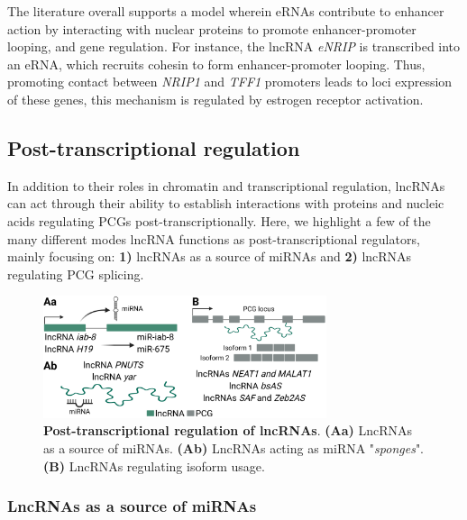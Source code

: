 The literature overall supports a model wherein eRNAs contribute to enhancer action by interacting with nuclear proteins to promote enhancer-promoter looping, and gene regulation.\autocite{arnold_2020_diversity,statello_2021_lncRNA_reg} For instance, the lncRNA \textit{eNRIP} is transcribed into an eRNA, which recruits cohesin to form enhancer-promoter looping. Thus, promoting contact between \textit{NRIP1} and \textit{TFF1} promoters leads to loci expression of these genes, this mechanism is regulated by estrogen receptor activation.\autocite{statello_2021_lncRNA_reg}

\subsection{Post-transcriptional regulation}
\label{sub-sec:lncRNA_post_trans_reg}

In addition to their roles in chromatin and transcriptional regulation, lncRNAs can act through their ability to establish interactions with proteins and nucleic acids regulating PCGs post-transcriptionally.\autocite{romero_2018_splicing,kopp_2018_functional} Here, we highlight a few of the many different modes lncRNA functions as post-transcriptional regulators, mainly focusing on: \textbf{1)} lncRNAs as a source of miRNAs and \textbf{2)} lncRNAs regulating PCG splicing. 

\begin{figure}[!htb]
  \centering
  \includegraphics[width=0.74\textwidth]{img/introduction/post_transcriptional_reg.png}
  \caption[Post-transcriptional regulation of lncRNAs]{\textbf{Post-transcriptional regulation of lncRNAs}. \textbf{(Aa)} LncRNAs as a source of miRNAs. \textbf{(Ab)} LncRNAs acting as miRNA "\textit{sponges}". \textbf{(B)} LncRNAs regulating isoform usage.}
  \label{fig:post-trans-reg}
\end{figure}

\subsubsection{LncRNAs as a source of miRNAs}
\label{subsub-sec:lncRNA-miRNA}

